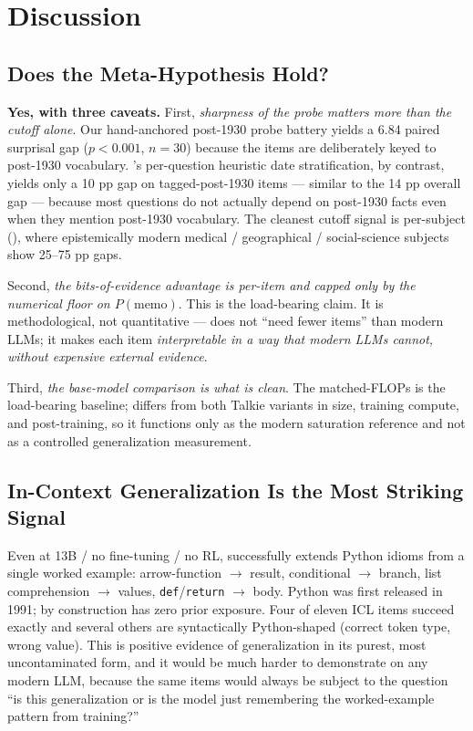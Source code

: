 \section{Discussion}
\label{sec:discussion}

\subsection{Does the Meta-Hypothesis Hold?}

\textbf{Yes, with three caveats.} First, \emph{sharpness of the probe matters more than the cutoff alone}. Our hand-anchored post-1930 probe battery yields a 6.84 \bpt paired surprisal gap ($p < 0.001$, $n=30$) because the items are deliberately keyed to post-1930 vocabulary. \mmlu's per-question heuristic date stratification, by contrast, yields only a 10 pp gap on tagged-post-1930 items --- similar to the 14 pp overall gap --- because most \mmlu questions do not actually depend on post-1930 facts even when they mention post-1930 vocabulary. The cleanest \mmlu cutoff signal is per-subject (), where epistemically modern medical / geographical / social-science subjects show 25--75 pp gaps.

Second, \emph{the bits-of-evidence advantage is per-item and capped only by the numerical floor on $P(\text{memo})$}. This is the load-bearing claim. It is methodological, not quantitative --- \talkienineteen does not ``need fewer items'' than modern LLMs; it makes each item \emph{interpretable in a way that modern LLMs cannot, without expensive external evidence}.

Third, \emph{the base-model comparison is what is clean}. The matched-FLOPs \talkieweb is the load-bearing baseline; \gptfour differs from both Talkie variants in size, training compute, and post-training, so it functions only as the modern saturation reference and not as a controlled generalization measurement.

\subsection{In-Context Generalization Is the Most Striking Signal}

Even at 13B / no fine-tuning / no RL, \talkienineteen successfully extends Python idioms from a single worked example: arrow-function $\to$ result, conditional $\to$ branch, list comprehension $\to$ values, \texttt{def}/\texttt{return} $\to$ body. Python was first released in 1991; by construction \talkienineteen has zero prior exposure. Four of eleven ICL items succeed exactly and several others are syntactically Python-shaped (correct token type, wrong value). This is positive evidence of generalization in its purest, most uncontaminated form, and it would be much harder to demonstrate on any modern LLM, because the same items would always be subject to the question ``is this generalization or is the model just remembering the worked-example pattern from training?''

